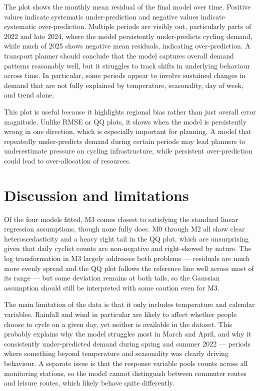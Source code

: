 \documentclass[
]{article}
\newcounter{none} %
\begin{document}
The plot shows the monthly mean residual of the final model over time. Positive values indicate systematic under-prediction and negative values indicate systematic over-prediction. Multiple periods are visibly out, particularly parts of 2022 and late 2024, where the model persistently under-predicts cycling demand, while much of 2025 shows negative mean residuals, indicating over-prediction. A transport planner should conclude that the model captures overall demand patterns reasonably well, but it struggles to track shifts in underlying behaviour across time. In particular, some periods appear to involve sustained changes in demand that are not fully explained by temperature, seasonality, day of week, and trend alone.

This plot is useful because it highlights regional bias rather than just overall error magnitude. Unlike RMSE or QQ plots, it shows when the model is persistently wrong in one direction, which is especially important for planning. A model that repeatedly under-predicts demand during certain periods may lead planners to underestimate pressure on cycling infrastructure, while persistent over-prediction could lead to over-allocation of resources.

\section{Discussion and limitations}\label{discussion-and-limitations}

Of the four models fitted, M3 comes closest to satisfying the standard linear
regression assumptions, though none fully does. M0 through M2 all show clear
heteroscedasticity and a heavy right tail in the QQ plot, which are
unsurprising given that daily cyclist counts are non-negative and right-skewed
by nature. The log transformation in M3 largely addresses both problems ---
residuals are much more evenly spread and the QQ plot follows the reference
line well across most of its range --- but some deviation remains at both tails,
so the Gaussian assumption should still be interpreted with some caution even
for M3.

The main limitation of the data is that it only includes temperature and
calendar variables. Rainfall and wind in particular are likely to affect
whether people choose to cycle on a given day, yet neither is available in the
dataset. This probably explains why the model struggles most in March and
April, and why it consistently under-predicted demand during spring and summer
2022 --- periods where something beyond temperature and seasonality was clearly
driving behaviour. A separate issue is that the response variable pools counts
across all monitoring stations, so the model cannot distinguish between
commuter routes and leisure routes, which likely behave quite differently.
\end{document}
